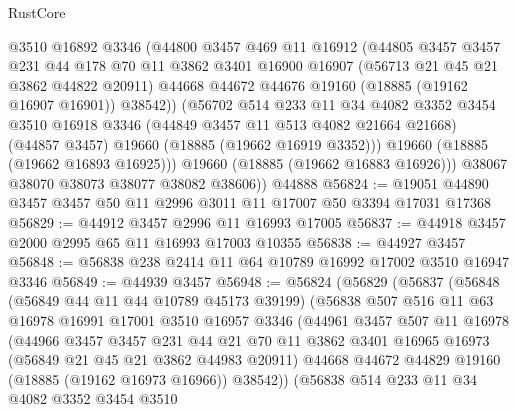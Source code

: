 \begin{lexlean}{RustCore}
\begin{coremodule}
            @3510
            @16892
            @3346
            (@44800
              @3457
              @469
              @11
              @16912
              (@44805
                @3457
                @3457
                @231
                @44
                @178
                @70
                @11
                @3862
                @3401
                @16900
                @16907
                (@56713 @21 @45 @21 @3862 @44822 @20911)
                @44668
                @44672
                @44676
                @19160
                (@18885 (@19162 @16907 @16901))
                @38542))
            (@56702
              @514
              @233
              @11
              @34
              @4082
              @3352
              @3454
              @3510
              @16918
              @3346
              (@44849 @3457 @11 @513 @4082 @21664 @21668)
              (@44857 @3457)
              @19660
              (@18885 (@19662 @16919 @3352)))
            @19660
            (@18885 (@19662 @16893 @16925)))
          @19660
          (@18885 (@19662 @16883 @16926)))
        @38067
        @38070
        @38073
        @38077
        @38082
        @38606))
    @44888
@56824 := @19051 @44890 @3457 @3457 @50 @11 @2996 @3011 @11 @17007 @50 @3394 @17031 @17368
@56829 := @44912 @3457 @2996 @11 @16993 @17005
@56837 := @44918 @3457 @2000 @2995 @65 @11 @16993 @17003 @10355
@56838 := @44927 @3457
@56848 := @56838 @238 @2414 @11 @64 @10789 @16992 @17002 @3510 @16947 @3346
@56849 := @44939 @3457
@56948 := @56824
    (@56829
      (@56837
        (@56848
          (@56849 @44 @11 @44 @10789 @45173 @39199)
          (@56838
            @507
            @516
            @11
            @63
            @16978
            @16991
            @17001
            @3510
            @16957
            @3346
            (@44961
              @3457
              @507
              @11
              @16978
              (@44966
                @3457
                @3457
                @231
                @44
                @21
                @70
                @11
                @3862
                @3401
                @16965
                @16973
                (@56849 @21 @45 @21 @3862 @44983 @20911)
                @44668
                @44672
                @44829
                @19160
                (@18885 (@19162 @16973 @16966))
                @38542))
            (@56838
              @514
              @233
              @11
              @34
              @4082
              @3352
              @3454
              @3510

\end{coremodule}
\end{lexlean}
